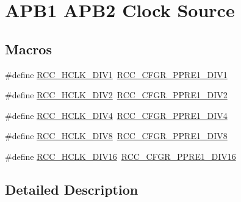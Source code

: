 \hypertarget{group___r_c_c___a_p_b1___a_p_b2___clock___source}{\section{A\-P\-B1 A\-P\-B2 Clock Source}
\label{group___r_c_c___a_p_b1___a_p_b2___clock___source}
}
\subsection*{Macros}
\begin{DoxyCompactItemize}
\item 
\#define \hyperlink{group___r_c_c___a_p_b1___a_p_b2___clock___source_ga8e3fcdef0e5d77bb61a52420fe1e9fbc}{R\-C\-C\-\_\-\-H\-C\-L\-K\-\_\-\-D\-I\-V1}~\hyperlink{group___peripheral___registers___bits___definition_gac8f6562bb2ecf65055a2f42cbb48ef11}{R\-C\-C\-\_\-\-C\-F\-G\-R\-\_\-\-P\-P\-R\-E1\-\_\-\-D\-I\-V1}
\item 
\#define \hyperlink{group___r_c_c___a_p_b1___a_p_b2___clock___source_ga4d2ebcf280d85e8449a5fb7b994b5169}{R\-C\-C\-\_\-\-H\-C\-L\-K\-\_\-\-D\-I\-V2}~\hyperlink{group___peripheral___registers___bits___definition_gaf832ad6844c907d9bb37c1536defcb0d}{R\-C\-C\-\_\-\-C\-F\-G\-R\-\_\-\-P\-P\-R\-E1\-\_\-\-D\-I\-V2}
\item 
\#define \hyperlink{group___r_c_c___a_p_b1___a_p_b2___clock___source_ga85b5f4fd936e22a3f4df5ed756f6e083}{R\-C\-C\-\_\-\-H\-C\-L\-K\-\_\-\-D\-I\-V4}~\hyperlink{group___peripheral___registers___bits___definition_ga0e340725f46e9462d9b02a079b9fa8ae}{R\-C\-C\-\_\-\-C\-F\-G\-R\-\_\-\-P\-P\-R\-E1\-\_\-\-D\-I\-V4}
\item 
\#define \hyperlink{group___r_c_c___a_p_b1___a_p_b2___clock___source_gadb18bc60e2c639cb59244bedb54f7bb3}{R\-C\-C\-\_\-\-H\-C\-L\-K\-\_\-\-D\-I\-V8}~\hyperlink{group___peripheral___registers___bits___definition_ga9ddd6d657837e1971bb86e3bf1c15e72}{R\-C\-C\-\_\-\-C\-F\-G\-R\-\_\-\-P\-P\-R\-E1\-\_\-\-D\-I\-V8}
\item 
\#define \hyperlink{group___r_c_c___a_p_b1___a_p_b2___clock___source_ga27ac27d48360121bc2dc68b99dc8845d}{R\-C\-C\-\_\-\-H\-C\-L\-K\-\_\-\-D\-I\-V16}~\hyperlink{group___peripheral___registers___bits___definition_ga5c38ba326bde7c7a18c4f7f2aacf823f}{R\-C\-C\-\_\-\-C\-F\-G\-R\-\_\-\-P\-P\-R\-E1\-\_\-\-D\-I\-V16}
\end{DoxyCompactItemize}


\subsection{Detailed Description}


